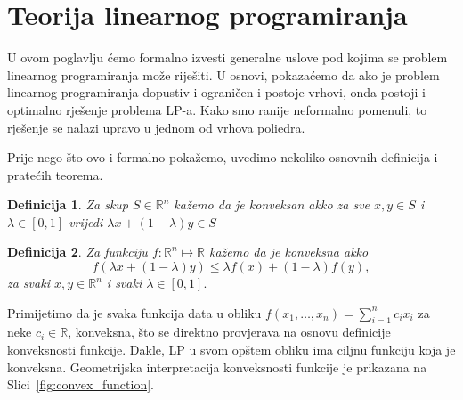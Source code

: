 \documentclass[a4paper, utf8, 11pt, colorlinks]{book}
\newtheorem{definition}{Definicija}
\begin{document}
\section{Teorija linearnog programiranja}
U ovom poglavlju ćemo formalno izvesti generalne uslove pod kojima se problem linearnog programiranja može riješiti. U osnovi, pokazaćemo da ako je problem
linearnog programiranja dopustiv i ograničen i postoje vrhovi, onda postoji i optimalno rješenje  problema LP-a. Kako smo ranije neformalno pomenuli,  to rješenje se nalazi upravo u jednom od vrhova poliedra. 

Prije nego što ovo i formalno pokažemo, uvedimo nekoliko osnovnih definicija i pratećih teorema. 

\begin{definition}
  Za skup $S \in \mathbb{R}^n$ kažemo da je konveksan akko za sve $x,y\in S$ i $\lambda\in [0, 1]$ vrijedi $\lambda x + (1 - \lambda)y \in S$
\end{definition}
\begin{definition}
   Za funkciju $f:\mathbb{R}^n \mapsto \mathbb{R}$ kažemo da je konveksna akko 
   $$ f( \lambda x + (1-\lambda) y) \leq \lambda f(x) + (1 -\lambda) f(y),$$
   za svaki $x,y \in \mathbb{R}^n$ i svaki $\lambda \in [0,1].$
\end{definition}
Primijetimo da je svaka funkcija data u obliku $f(x_1, \ldots, x_n) = \sum_{i=1}^n c_i x_i$ za neke $c_i \in \mathbb{R}$, konveksna, što se direktno provjerava na osnovu definicije konveksnosti funkcije. Dakle, LP u svom opštem obliku  ima ciljnu funkciju koja je konveksna. Geometrijska interpretacija konveksnosti funkcije je prikazana na Slici~\ref{fig:convex_function}.
\end{document}
